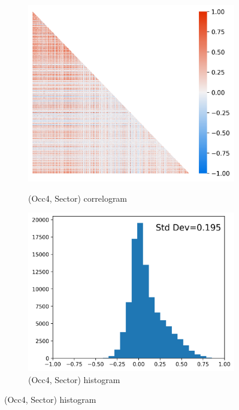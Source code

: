 \documentclass[12pt]{article}
\theoremstyle{definition}
\theoremstyle{plain}
\begin{document}
\begin{figure}[!htbp]
\begin{subfigure}[b]{\w\textwidth}
		\label{fig:correlograms_hist_iota_gamma_sorted}
	\end{subfigure}\vfill
	\begin{subfigure}[b]{\w\textwidth}
		\centering
		\caption{(Occ4, Sector) correlogram}
		\includegraphics[height=.25\textheight]{../Results/correlograms/correlograms_iota_occ2Xmeso_recode_sorted}
		\label{fig:correlograms_occ4_first_recode_sector_IBGE_sorted}
	\end{subfigure}\hfill
	\begin{subfigure}[b]{\w\textwidth}
		\centering
		\caption{(Occ4, Sector) histogram}
		\includegraphics[height=.25\textheight]{../Results/correlograms/correlograms_hist_iota_occ2Xmeso_recode_sorted}

\end{subfigure}
\end{figure}
\end{document}
